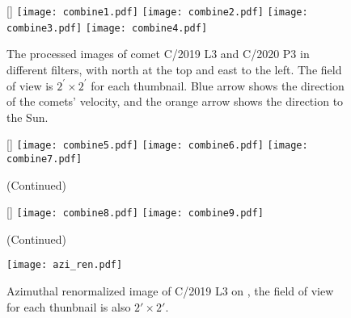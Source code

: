 \begin{figure}
    \centering
    [\linewidth]{
        \texttt{[image: combine1.pdf]}
        \texttt{[image: combine2.pdf]} 
        \texttt{[image: combine3.pdf]}
        \texttt{[image: combine4.pdf]}
    }
    \caption{The processed images of comet C/2019 L3 and C/2020 P3 in different filters, with north at the top and east to the left. The field of view is $ 2^{\prime} \times 2^{\prime} $ for each thumbnail. Blue arrow shows the direction of the comets' velocity, and the orange arrow shows the direction to the Sun. }
    \label{fig:combinedimg}
\end{figure}

\begin{figure}
    \centering
    \ContinuedFloat
    [\linewidth]{
        \texttt{[image: combine5.pdf]}
        \texttt{[image: combine6.pdf]} 
        \texttt{[image: combine7.pdf]} 
    }
        
    \caption{(Continued)}
\end{figure}

\begin{figure}
    \centering
    \ContinuedFloat
    [\linewidth]{
        \texttt{[image: combine8.pdf]}
        \texttt{[image: combine9.pdf]} 
    }
    
    \caption{(Continued)}
\end{figure}

\begin{figure}
    \centering
    \texttt{[image: azi\_ren.pdf]}
    \caption{Azimuthal renormalized image of C/2019 L3 on , the field of view for each thunbnail is also $\ang{;2;}\times\ang{;2;}$. \label{fig:aziren}}
\end{figure}
    
